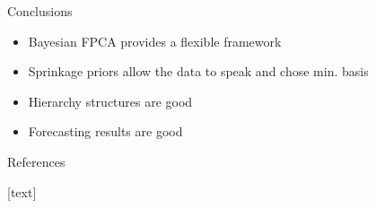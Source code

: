 \documentclass[final]{beamer}
\newlength{\onecolwid}
\begin{document}
\begin{frame}[t]
\begin{columns}[t]
\begin{column}{\onecolwid}
\vspace{-20mm}


\begin{block}{Conclusions}

\begin{itemize}
\item Bayesian FPCA provides a flexible framework \\
\item Sprinkage priors allow the data to speak and chose min. basis\\
\item Hierarchy structures are good \\
\item Forecasting results are good \\
\end{itemize}

\end{block}


\begin{block}{References}

[text]
\nocite{*}



\end{block}




\end{column} %

\end{columns} %

\end{frame} %
\end{document}
